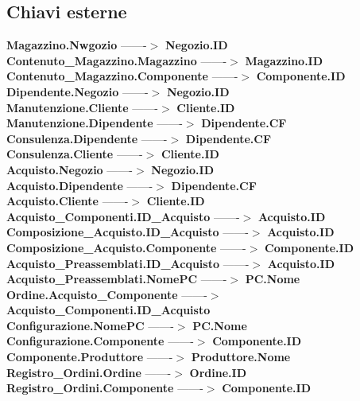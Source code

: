 \subsection{Chiavi esterne}
\textbf{Magazzino.Nwgozio} -------$>$ \textbf{Negozio.ID}\\
\textbf{Contenuto\_Magazzino.Magazzino} -------$>$ \textbf{Magazzino.ID}\\
\textbf{Contenuto\_Magazzino.Componente} -------$>$ \textbf{Componente.ID}\\
\textbf{Dipendente.Negozio} -------$>$ \textbf{Negozio.ID}\\
\textbf{Manutenzione.Cliente} -------$>$ \textbf{Cliente.ID}\\
\textbf{Manutenzione.Dipendente} -------$>$ \textbf{Dipendente.CF}\\
\textbf{Consulenza.Dipendente} -------$>$ \textbf{Dipendente.CF}\\
\textbf{Consulenza.Cliente} -------$>$ \textbf{Cliente.ID}\\
\textbf{Acquisto.Negozio} -------$>$ \textbf{Negozio.ID}\\
\textbf{Acquisto.Dipendente} -------$>$ \textbf{Dipendente.CF}\\
\textbf{Acquisto.Cliente} -------$>$ \textbf{Cliente.ID}\\
\textbf{Acquisto\_Componenti.ID\_Acquisto} -------$>$ \textbf{Acquisto.ID}\\
\textbf{Composizione\_Acquisto.ID\_Acquisto} -------$>$ \textbf{Acquisto.ID}\\
\textbf{Composizione\_Acquisto.Componente} -------$>$ \textbf{Componente.ID}\\
\textbf{Acquisto\_Preassemblati.ID\_Acquisto} -------$>$ \textbf{Acquisto.ID}\\
\textbf{Acquisto\_Preassemblati.NomePC} -------$>$ \textbf{PC.Nome}\\
\textbf{Ordine.Acquisto\_Componente} -------$>$ \textbf{Acquisto\_Componenti.ID\_Acquisto}\\
\textbf{Configurazione.NomePC} -------$>$ \textbf{PC.Nome}\\
\textbf{Configurazione.Componente} -------$>$ \textbf{Componente.ID}\\
\textbf{Componente.Produttore} -------$>$ \textbf{Produttore.Nome}\\
\textbf{Registro\_Ordini.Ordine} -------$>$ \textbf{Ordine.ID}\\
\textbf{Registro\_Ordini.Componente} -------$>$ \textbf{Componente.ID}\\
